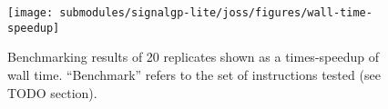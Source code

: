 \begin{figure}[h]

\centering
\texttt{[image: submodules/signalgp-lite/joss/figures/wall-time-speedup]}

\caption{%
Benchmarking results of 20 replicates shown as a times-speedup of wall time.
``Benchmark'' refers to the set of instructions tested (see TODO section).
} \label{fig:bench-wall}

\end{figure}
